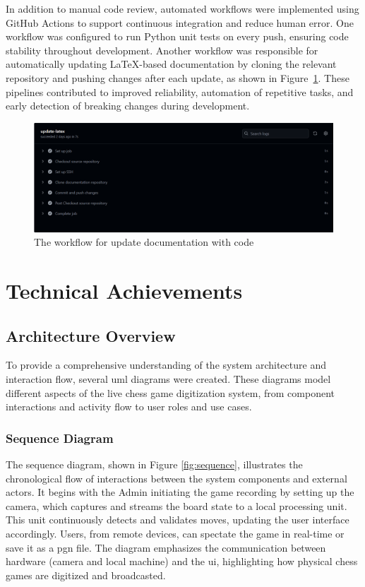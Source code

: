 In addition to manual code review, automated workflows were implemented using GitHub Actions to support continuous integration and reduce human error. One workflow was configured to run Python unit tests on every push, ensuring code stability throughout development. Another workflow was responsible for automatically updating LaTeX-based documentation by cloning the relevant repository and pushing changes after each update, as shown in Figure~\ref{fig:workflow-latex}. These pipelines contributed to improved reliability, automation of repetitive tasks, and early detection of breaking changes during development. \\

\begin{figure}[h!] \centering 
\includegraphics[width=0.75\linewidth]{figures/results/workflows/latex.png}\caption[Upload LaTex workflow]{The workflow for update documentation with code}\label{fig:workflow-latex} \end{figure}

\section{Technical Achievements}

\subsection{Architecture Overview}
\label{subsec:diagrams}

To provide a comprehensive understanding of the system architecture and interaction flow, several \gls{uml} diagrams were created. These diagrams model different aspects of the live chess game digitization system, from component interactions and activity flow to user roles and use cases.

\subsubsection*{Sequence Diagram}
\label{subsubsec:sequence-diagram}

The sequence diagram, shown in Figure \ref{fig:sequence}, illustrates the chronological flow of interactions between the system components and external actors. It begins with the Admin initiating the game recording by setting up the camera, which captures and streams the board state to a local processing unit. This unit continuously detects and validates moves, updating the user interface accordingly. Users, from remote devices, can spectate the game in real-time or save it as a \gls{pgn} file. The diagram emphasizes the communication between hardware (camera and local machine) and the \gls{ui}, highlighting how physical chess games are digitized and broadcasted.

